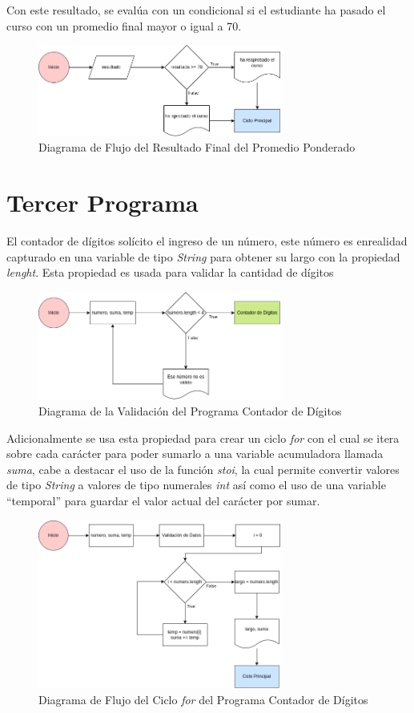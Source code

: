 \documentclass{article}
\begin{document}
Con este resultado, se evalúa con un condicional si el estudiante ha pasado el curso con un promedio final mayor o igual a 70.

\begin{figure}[H]
    \centering
    \includegraphics[width=8cm]{promedio_ponderado_salida}
    \caption{Diagrama de Flujo del Resultado Final del Promedio Ponderado}
\end{figure}

\section{Tercer Programa}

El contador de dígitos solícito el ingreso de un número, este número es enrealidad capturado en una variable de tipo \emph{String} para obtener su largo con la propiedad \emph{lenght}. Esta propiedad es usada para validar la cantidad de dígitos 

\begin{figure}[h]
    \centering
    \includegraphics[width=8cm]{contador_digitos_validacion}
    \caption{Diagrama de la Validación del Programa Contador de Dígitos}
\end{figure}

Adicionalmente se usa esta propiedad para crear un ciclo \emph{for} con el cual se itera sobre cada carácter para poder sumarlo a una variable acumuladora llamada \emph{suma}, cabe a destacar el uso de la función \emph{stoi}, la cual permite convertir valores de tipo \emph{String} a valores de tipo numerales \emph{int} así como el uso de una variable ``temporal'' para guardar el valor actual del carácter por sumar.

\begin{figure}[H]
    \centering
    \includegraphics[width=8cm]{contador_digitos_ciclo}
    \caption{Diagrama de Flujo del Ciclo \emph{for} del Programa Contador de Dígitos}
\end{figure}
\end{document}
